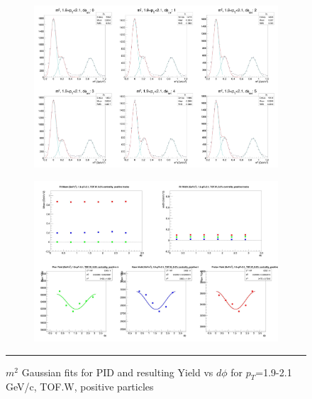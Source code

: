\begin{figure}[H]
  \centering
    \begin{subfigure}[p]{1\textwidth}
    \includegraphics[width=1\textwidth]{lowptfits/yieldvsdphi_tof1_cent0_ch1_pT-19-21.jpg}
    \end{subfigure}
    \begin{subfigure}[p]{1\textwidth}
    \includegraphics[width=1\textwidth]{lowptfits/fitParams_tof1_cent0_ch1_pT-19-21.jpg}
    \end{subfigure}
    \rule{35em}{0.5pt}
  \caption[PID fits and Yield vs $d\phi$ for $p_T$=1.9-2.1 GeV/c, TOF.W, positive particles ]{$m^2$ Gaussian fits for PID and resulting Yield vs $d\phi$ for $p_T$=1.9-2.1 GeV/c, TOF.W, positive particles}
  \label{fig:fits19-21pos}
\end{figure}

